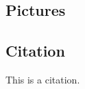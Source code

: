 \documentclass{article}
\begin{document}

\subsection{Pictures}


\subsection{Citation}

This is a citation\cite{Eg}.

\newpage





\end{document}
